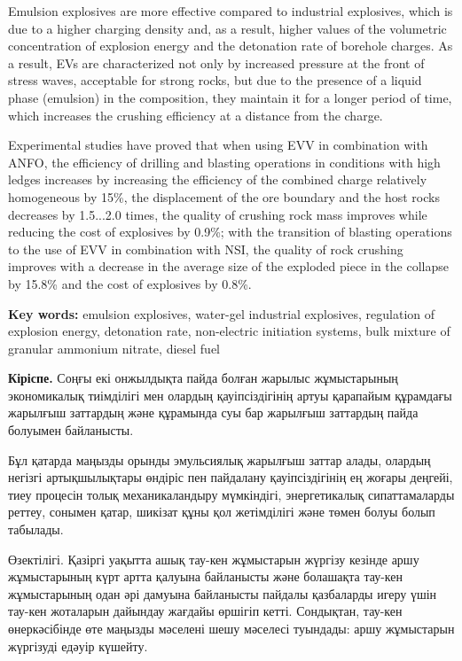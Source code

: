 Emulsion explosives are more effective compared to industrial
explosives, which is due to a higher charging density and, as a result,
higher values of the volumetric concentration of explosion energy and
the detonation rate of borehole charges. As a result, EVs are
characterized not only by increased pressure at the front of stress
waves, acceptable for strong rocks, but due to the presence of a liquid
phase (emulsion) in the composition, they maintain it for a longer
period of time, which increases the crushing efficiency at a distance
from the charge.

Experimental studies have proved that when using EVV in combination with
ANFO, the efficiency of drilling and blasting operations in conditions
with high ledges increases by increasing the efficiency of the combined
charge relatively homogeneous by 15\%, the displacement of the ore
boundary and the host rocks decreases by 1.5...2.0 times, the quality of
crushing rock mass improves while reducing the cost of explosives by
0.9\%; with the transition of blasting operations to the use of EVV in
combination with NSI, the quality of rock crushing improves with a
decrease in the average size of the exploded piece in the collapse by
15.8\% and the cost of explosives by 0.8\%.

{\bfseries Key words:} emulsion explosives, water-gel industrial
explosives, regulation of explosion energy, detonation rate,
non-electric initiation systems, bulk mixture of granular ammonium
nitrate, diesel fuel

{\bfseries Кіріспе.} Соңғы екі онжылдықта пайда болған жарылыс жұмыстарының
экономикалық тиімділігі мен олардың қауіпсіздігінің артуы қарапайым
құрамдағы жарылғыш заттардың және құрамында суы бар жарылғыш заттардың
пайда болуымен байланысты.

Бұл қатарда маңызды орынды эмульсиялық жарылғыш заттар алады, олардың
негізгі артықшылықтары өндіріс пен пайдалану қауіпсіздігінің ең жоғары
деңгейі, тиеу процесін толық механикаландыру мүмкіндігі, энергетикалық
сипаттамаларды реттеу, сонымен қатар, шикізат құны қол жетімділігі және
төмен болуы болып табылады.

Өзектілігі. Қазіргі уақытта ашық тау-кен жұмыстарын жүргізу кезінде аршу
жұмыстарының күрт артта қалуына байланысты және болашақта тау-кен
жұмыстарының одан әрі дамуына байланысты пайдалы қазбаларды игеру үшін
тау-кен жоталарын дайындау жағдайы өршігіп кетті. Сондықтан, тау-кен
өнеркәсібінде өте маңызды мәселені шешу мәселесі туындады: аршу
жұмыстарын жүргізуді едәуір күшейту.

